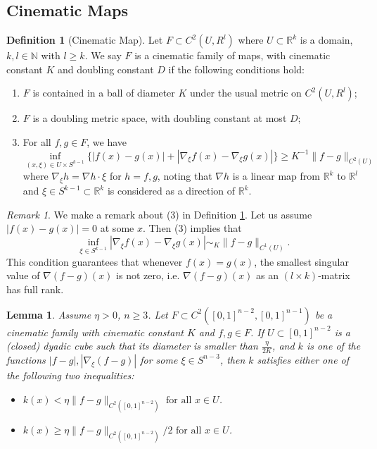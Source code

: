 \documentclass[11pt,a4paper,reqno]{amsart}
\newcommand{\R}{\mathbb{R}}
\newcommand{\1}{\mathbf{1}}
\numberwithin{equation}{section}
\theoremstyle{plain}
\newtheorem{lemma}[equation]{Lemma}
\theoremstyle{definition}
\newtheorem{definition}[equation]{Definition}
\theoremstyle{remark}
\newtheorem{remark}[equation]{Remark}
\begin{document}
\subsection{Cinematic Maps}
\begin{definition}[Cinematic Map]\label{cine}
  Let $F \subset C^2(U,R^l)$ where $U \subset \mathbb{R}^k$ is a domain, $k,l \in \mathbb{N}$ with $l \ge k$. We say $F$ is a cinematic family of
maps, with cinematic constant $K$ and doubling constant $D$ if the following conditions
hold:
\begin{enumerate}
  \item $F$ is contained in a ball of diameter $K$ under the usual metric on $C^2(U,R^l)$;
  \item $F$ is a doubling metric space, with doubling constant at most $D$;
  \item For all $f, g \in F$, we have
  $$  \inf_{(x,\xi) \in U \times S^{k-1}} \{ |f(x) - g(x)| + |\nabla_\xi f(x) -\nabla_\xi g(x)| \} \ge K^{-1} \|f-g\|_{C^2(U)}  $$
  where $\nabla_\xi h= \nabla h \cdot \xi$ for $h=f,g$, noting that $\nabla h$ is a linear map from $\R^{k}$ to $\R^l$ and $\xi \in S^{k-1} \subset \R^{k}$ is considered as a direction of $\R^{k}$.
\end{enumerate}
\end{definition}
\begin{remark} \rm
We make a remark about (3) in Definition \ref{cine}. Let us  assume $|f(x) - g(x)|=0$ at some $x$. Then (3) implies that
$$\inf_{\xi \in  S^{k-1}}|\nabla_\xi f(x) -\nabla_\xi g(x)| \sim_K \|f-g\|_{C^1(U)}.$$
This condition guarantees that whenever $f(x)=g(x)$, the smallest singular value of $\nabla(f-g)(x)$ is not zero, i.e. $\nabla(f-g)(x)$ as an $(l \times k)$-matrix has full rank.
\end{remark}




\begin{lemma} \label{local}
Assume $\eta>0$, $n \ge 3$.
Let
$F \subset C^{2}([0,1]^{n-2},[0,1]^{n-1})$ be a cinematic family with cinematic constant $K$ and $f,g \in F$.
  If $U \subset [0,1]^{n-2}$ is a (closed) dyadic cube such that its diameter is smaller than $\frac\eta{2K}$, and $k$ is one of the functions $|f-g|, |\nabla_\xi (f-g)|$ for some $\xi \in S^{n-3}$, then $k$ satisfies either one of the following two inequalities:
   \begin{itemize}
     \item[(S)] $ k(x) < \eta\|f-g\|_{C^2([0,1]^{n-2}) } \mbox{ for all } x \in U$.
     \item[(L)] $k(x) \ge \eta \|f-g\|_{C^2([0,1]^{n-2})}/2 \mbox{ for all } x \in U$.
   \end{itemize}
\end{lemma}
\end{document}
